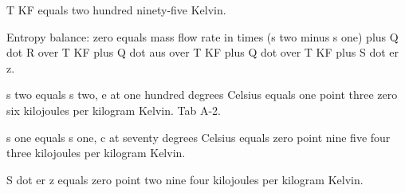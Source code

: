T KF equals two hundred ninety-five Kelvin.

Entropy balance: zero equals mass flow rate in times (s two minus s one) plus Q dot R over T KF plus Q dot aus over T KF plus Q dot over T KF plus S dot er z.

s two equals s two, e at one hundred degrees Celsius equals one point three zero six kilojoules per kilogram Kelvin. Tab A-2.

s one equals s one, c at seventy degrees Celsius equals zero point nine five four three kilojoules per kilogram Kelvin.

S dot er z equals zero point two nine four kilojoules per kilogram Kelvin.